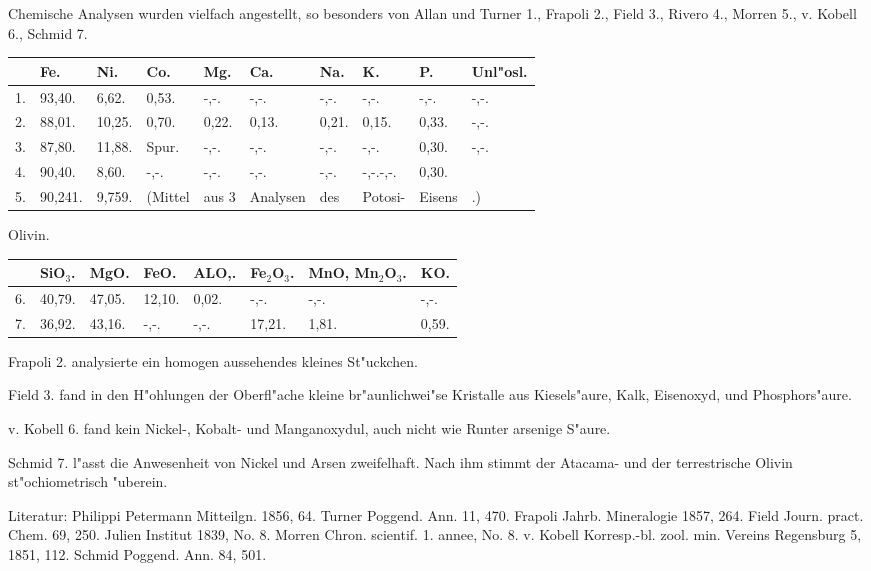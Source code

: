 \documentclass[a4paper, 11pt, oneside]{article}
\begin{document}
Chemische Analysen wurden vielfach angestellt, so besonders von Allan und Turner 1., Frapoli 2., Field 3., Rivero 4., Morren 5., v. Kobell 6., Schmid 7.
\begin{table}[H]
    \centering\swabfamily\Large
    \normalsize
    \begin{tabular}{l l l l l l l l l l}
         & Fe. & Ni. & Co. & Mg. & Ca. & Na. & K. & P. & Unl"osl. \\ \hline
        1. & 93,40. & 6,62. & 0,53. & -,-. & -,-. & -,-. & -,-. & -,-. & -,-. \\
        2. & 88,01. & 10,25. & 0,70. & 0,22. & 0,13. & 0,21. & 0,15. & 0,33. & -,-. \\
        3. & 87,80. & 11,88. & Spur. & -,-. & -,-. & -,-. & -,-. & 0,30. & -,-. \\
        4. & 90,40. & 8,60. & -,-. & -,-. & -,-. & -,-. & -,-.-,-. & 0,30. &  \\
        5. & 90,241. & 9,759. & (Mittel & aus 3 & Analysen & des & Potosi- & Eisens & .) \\
    \end{tabular}
\end{table}

Olivin.
\begin{table}[H]
    \centering\swabfamily\Large
    \begin{tabular}{l l l l l l l l}
         & SiO$_{3}$. & MgO. & FeO. & ALO,. & Fe$_{2}$O$_{3}$. & MnO, Mn$_{2}$O$_{3}$. & KO. \\ \hline
        6. & 40,79. & 47,05. & 12,10. & 0,02. & -,-. & -,-. & -,-. \\
        7. & 36,92. & 43,16. & -,-. & -,-. & 17,21. & 1,81. & 0,59. \\
    \end{tabular}
\end{table}

Frapoli 2. analysierte ein homogen aussehendes kleines St"uckchen.

Field 3. fand in den H"ohlungen der Oberfl"ache kleine br"aunlichwei"se Kristalle aus Kiesels"aure, Kalk, Eisenoxyd, und Phosphors"aure.

v. Kobell 6. fand kein Nickel-, Kobalt- und Manganoxydul, auch nicht wie Runter arsenige S"aure.

Schmid 7. l"asst die Anwesenheit von Nickel und Arsen zweifelhaft. Nach ihm stimmt der Atacama- und der terrestrische Olivin st"ochiometrisch "uberein.

\normalsize
Literatur: Philippi Petermann Mitteilgn. 1856, 64. Turner Poggend. Ann. 11, 470. Frapoli Jahrb. Mineralogie 1857, 264. Field Journ. pract. Chem. 69, 250. Julien Institut 1839, No. 8. Morren Chron. scientif. 1. annee, No. 8. v. Kobell Korresp.-bl. zool. min. Vereins Regensburg 5, 1851, 112. Schmid Poggend. Ann. 84, 501.
\end{document}

